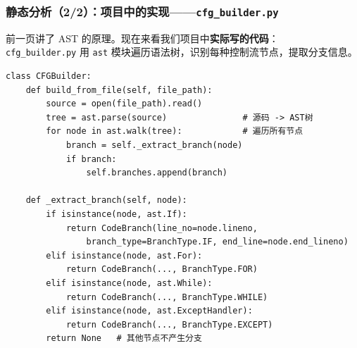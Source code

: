 \documentclass[presentation,aspectratio=169,fontset=none]{ctexbeamer}
\begin{document}
\begin{frame}[fragile]
\frametitle{静态分析（2/2）：项目中的实现——\texttt{cfg\_builder.py}}
{\small 前一页讲了 AST 的原理。现在来看我们项目中\textbf{实际写的代码}：\\
\texttt{cfg\_builder.py} 用 \texttt{ast} 模块遍历语法树，识别每种控制流节点，提取分支信息。}

\vspace{0.05cm}
{\scriptsize
\begin{verbatim}
class CFGBuilder:
    def build_from_file(self, file_path):
        source = open(file_path).read()
        tree = ast.parse(source)               # 源码 -> AST树
        for node in ast.walk(tree):            # 遍历所有节点
            branch = self._extract_branch(node)
            if branch:
                self.branches.append(branch)

    def _extract_branch(self, node):
        if isinstance(node, ast.If):
            return CodeBranch(line_no=node.lineno,
                branch_type=BranchType.IF, end_line=node.end_lineno)
        elif isinstance(node, ast.For):
            return CodeBranch(..., BranchType.FOR)
        elif isinstance(node, ast.While):
            return CodeBranch(..., BranchType.WHILE)
        elif isinstance(node, ast.ExceptHandler):
            return CodeBranch(..., BranchType.EXCEPT)
        return None   # 其他节点不产生分支
\end{verbatim}}
\end{frame}

\end{document}
